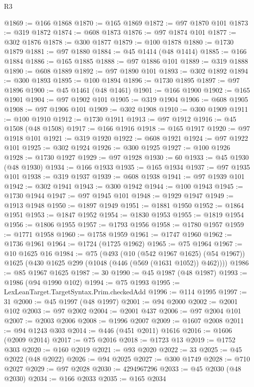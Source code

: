 \begin{lexlean}{R3}
\begin{coremodule}
@1869 := @166 @1868
@1870 := @165 @1869
@1872 := @97 @1870 @101
@1873 := @319 @1872
@1874 := @608 @1873
@1876 := @97 @1874 @101
@1877 := @302 @1876
@1878 := @300 @1877
@1879 := @100 @1878
@1880 := @1730 @1879
@1881 := @97 @1880
@1884 := @45 @1414 (@48 @1414)
@1885 := @166 @1884
@1886 := @165 @1885
@1888 := @97 @1886 @101
@1889 := @319 @1888
@1890 := @608 @1889
@1892 := @97 @1890 @101
@1893 := @302 @1892
@1894 := @300 @1893
@1895 := @100 @1894
@1896 := @1730 @1895
@1897 := @97 @1896
@1900 := @45 @1461 (@48 @1461)
@1901 := @166 @1900
@1902 := @165 @1901
@1904 := @97 @1902 @101
@1905 := @319 @1904
@1906 := @608 @1905
@1908 := @97 @1906 @101
@1909 := @302 @1908
@1910 := @300 @1909
@1911 := @100 @1910
@1912 := @1730 @1911
@1913 := @97 @1912
@1916 := @45 @1508 (@48 @1508)
@1917 := @166 @1916
@1918 := @165 @1917
@1920 := @97 @1918 @101
@1921 := @319 @1920
@1922 := @608 @1921
@1924 := @97 @1922 @101
@1925 := @302 @1924
@1926 := @300 @1925
@1927 := @100 @1926
@1928 := @1730 @1927
@1929 := @97 @1928
@1930 := 60
@1933 := @45 @1930 (@48 @1930)
@1934 := @166 @1933
@1935 := @165 @1934
@1937 := @97 @1935 @101
@1938 := @319 @1937
@1939 := @608 @1938
@1941 := @97 @1939 @101
@1942 := @302 @1941
@1943 := @300 @1942
@1944 := @100 @1943
@1945 := @1730 @1944
@1947 := @97 @1945 @101
@1948 := @1929 @1947
@1949 := @1913 @1948
@1950 := @1897 @1949
@1951 := @1881 @1950
@1952 := @1864 @1951
@1953 := @1847 @1952
@1954 := @1830 @1953
@1955 := @1819 @1954
@1956 := @1806 @1955
@1957 := @1793 @1956
@1958 := @1780 @1957
@1959 := @1771 @1958
@1960 := @1758 @1959
@1961 := @1747 @1960
@1962 := @1736 @1961
@1964 := @1724 (@1725 @1962)
@1965 := @75 @1964
@1967 := @10 @1625 @16
@1984 := @75
    (@493
      (@10 (@542 @1967 @1625) (@54 @1967))
      @1625
      (@430 @1625 @299 (@1048 (@446 (@569 (@1631 @1052)) @462))))
@1986 := @85 @1967 @1625
@1987 := 30
@1990 := @45 @1987 (@48 @1987)
@1993 := @1986 (@94 @1990 @102)
@1994 := @75 @1993
@1995 := LexLeanTarget.TargetSyntax.Prim.checkedAdd
@1996 := @114 @1995
@1997 := 31
@2000 := @45 @1997 (@48 @1997)
@2001 := @94 @2000
@2002 := @2001 @102
@2003 := @97 @2002
@2004 := @2001 @437
@2006 := @97 @2004 @101
@2007 := @2003 @2006
@2008 := @1996 @2007
@2009 := @1607 @2008
@2011 := @94 @1243 @303
@2014 := @446 (@451 @2011) @1616
@2016 := @1606 (@2009 @2014)
@2017 := @75 @2016
@2018 := @1723 @13
@2019 := @1752 @303
@2020 := @160 @2019
@2021 := @93 @2020
@2022 := 33
@2025 := @45 @2022 (@48 @2022)
@2026 := @94 @2025
@2027 := @300 @1749
@2028 := @710 @2027
@2029 := @97 @2028
@2030 := 4294967296
@2033 := @45 @2030 (@48 @2030)
@2034 := @166 @2033
@2035 := @165 @2034

\end{coremodule}
\end{lexlean}
